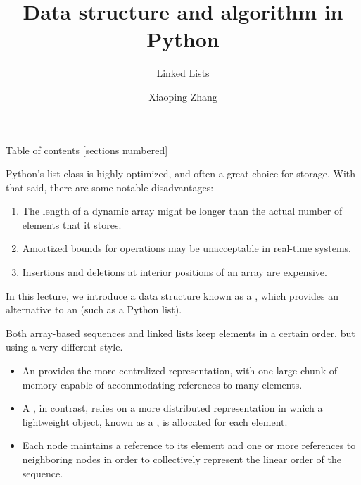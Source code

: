 \documentclass[10pt]{beamer}
\title{Data structure and algorithm in Python}
\subtitle{Linked Lists}
\date{}%
\author{Xiaoping Zhang}
\institute{School of Mathematics and Statistics, Wuhan University}
\newcommand\Fontvi{\fontsize{6.5}{7.2}\selectfont}
\begin{document}
\maketitle

\begin{frame}{Table of contents}
  [sections numbered]
  \tableofcontents[hideallsubsections]
\end{frame}

\begin{frame}
  Python’s list class is highly optimized, and often a great choice for storage. With that said, there are some notable disadvantages:
  \begin{enumerate}
  \item The length of a dynamic array might be longer than the actual number of elements that it stores.
  \item Amortized bounds for operations may be unacceptable in real-time systems.
  \item Insertions and deletions at interior positions of an array are expensive.
  \end{enumerate}

  In this lecture, we introduce a data structure known as a , which provides an alternative to an  (such as a Python list).
\end{frame}

\begin{frame}
   Both array-based sequences and linked lists keep elements in a certain order, but using a very different style.
  \begin{itemize}
  \item An  provides the more centralized representation, with one large chunk of memory capable of accommodating references to many elements.
  \item A , in contrast, relies on a more distributed representation in which a lightweight object, known as a , is allocated for each element.
  \item[] Each node maintains a reference to its element and one or more references to neighboring nodes in order to collectively represent the linear order of the sequence.
  \end{itemize}
\end{frame}







\end{document}
